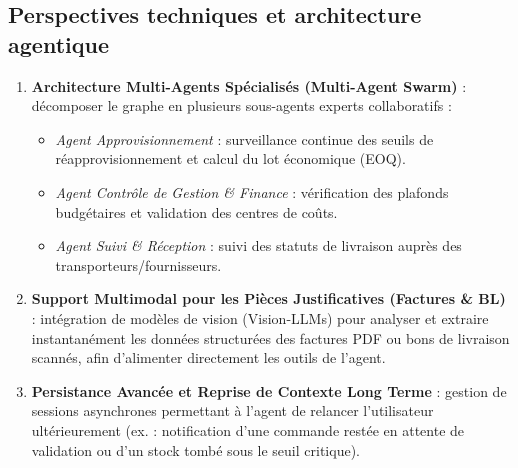 \subsection{Perspectives techniques et architecture agentique}
\begin{enumerate}
    \item \textbf{Architecture Multi-Agents Spécialisés (Multi-Agent Swarm)} : décomposer le graphe en plusieurs sous-agents experts collaboratifs :
    \begin{itemize}
        \item \textit{Agent Approvisionnement} : surveillance continue des seuils de réapprovisionnement et calcul du lot économique (EOQ).
        \item \textit{Agent Contrôle de Gestion \& Finance} : vérification des plafonds budgétaires et validation des centres de coûts.
        \item \textit{Agent Suivi \& Réception} : suivi des statuts de livraison auprès des transporteurs/fournisseurs.
    \end{itemize}
    \item \textbf{Support Multimodal pour les Pièces Justificatives (Factures \& BL)} : intégration de modèles de vision (Vision-LLMs) pour analyser et extraire instantanément les données structurées des factures PDF ou bons de livraison scannés, afin d'alimenter directement les outils de l'agent.
    \item \textbf{Persistance Avancée et Reprise de Contexte Long Terme} : gestion de sessions asynchrones permettant à l'agent de relancer l'utilisateur ultérieurement (ex. : notification d'une commande restée en attente de validation ou d'un stock tombé sous le seuil critique).
\end{enumerate}

